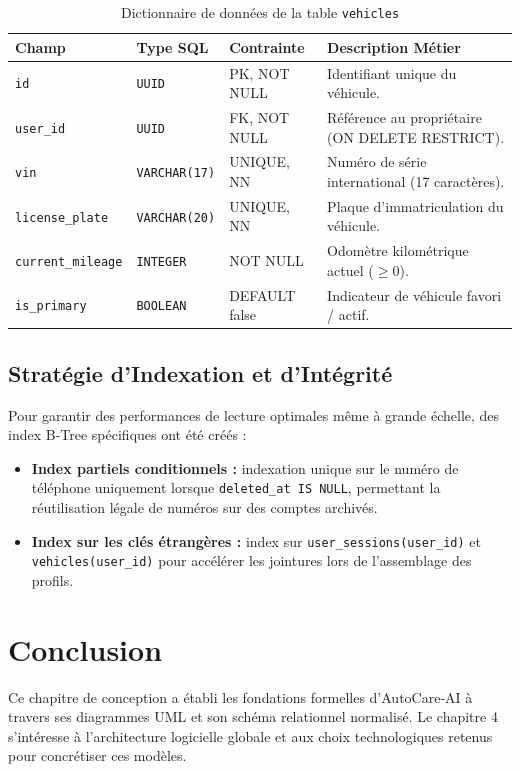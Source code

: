 \documentclass[12pt,a4paper,twoside,openright]{report}
\newcommand{\itembullet}{\textcolor{secondaryBlue}{$\blacktriangleright$}}
\begin{document}
  \begin{table}[H]
  \centering
  \small
  \begin{tabularx}{\textwidth}{p{3.2cm} p{2.8cm} p{2.0cm} X}
  \toprule
  \textbf{Champ} & \textbf{Type SQL} & \textbf{Contrainte} & \textbf{Description M\'etier} \\
  \midrule
  \texttt{id} & \texttt{UUID} & PK, NOT NULL & Identifiant unique du v\'ehicule. \\
  \texttt{user\_id} & \texttt{UUID} & FK, NOT NULL & R\'ef\'erence au propri\'etaire (ON DELETE RESTRICT). \\
  \texttt{vin} & \texttt{VARCHAR(17)} & UNIQUE, NN & Num\'ero de s\'erie international (17 caract\`eres). \\
  \texttt{license\_plate} & \texttt{VARCHAR(20)} & UNIQUE, NN & Plaque d'immatriculation du v\'ehicule. \\
  \texttt{current\_mileage} & \texttt{INTEGER} & NOT NULL & Odom\`etre kilom\'etrique actuel ($\ge 0$). \\
  \texttt{is\_primary} & \texttt{BOOLEAN} & DEFAULT false & Indicateur de v\'ehicule favori / actif. \\
  \bottomrule
  \end{tabularx}
  \caption{Dictionnaire de donn\'ees de la table \texttt{vehicles}}
  \label{tab:data_dict_vehicles}
  \end{table}

  \subsection{Strat\'egie d'Indexation et d'Int\'egrit\'e}
  Pour garantir des performances de lecture optimales m\^eme \`a grande \'echelle, des index B-Tree sp\'ecifiques ont \'et\'e cr\'e\'es :
  \begin{itemize}[label=\itembullet]
    \item \textbf{Index partiels conditionnels :} indexation unique sur le num\'ero de t\'el\'ephone uniquement lorsque \texttt{deleted\_at IS NULL}, permettant la r\'eutilisation l\'egale de num\'eros sur des comptes archiv\'es.
    \item \textbf{Index sur les cl\'es \'etrang\`eres :} index sur \texttt{user\_sessions(user\_id)} et \texttt{vehicles(user\_id)} pour acc\'el\'erer les jointures lors de l'assemblage des profils.
  \end{itemize}

  \section{Conclusion}
  Ce chapitre de conception a \'etabli les fondations formelles d'AutoCare-AI \`a travers ses diagrammes UML et son sch\'ema relationnel normalis\'e. Le chapitre 4 s'int\'eresse \`a l'architecture logicielle globale et aux choix technologiques retenus pour concr\'etiser ces mod\`eles.
\end{document}
